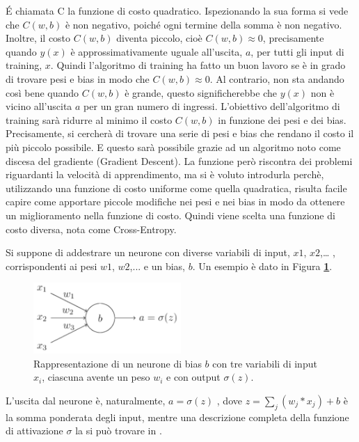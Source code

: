 \'E chiamata C la funzione di costo quadratico. Ispezionando la sua forma si vede che $C( w,b )$ è non negativo, poiché ogni termine della somma è non negativo. Inoltre, il costo $C( w,b )$ diventa piccolo, cioè $C( w,b ) \approx 0$, precisamente quando $y( x )$ è approssimativamente uguale all'uscita, $a$, per tutti gli input di training, $x$.
Quindi l'algoritmo di training ha fatto un buon lavoro se è in grado di trovare pesi e bias in modo che $C( w , b ) \approx 0$. Al contrario, non sta andando così bene quando $C( w , b )$ è grande, questo significherebbe che $y( x )$ non è vicino all'uscita $a$ per un gran numero di ingressi. 
L'obiettivo dell'algoritmo di training sarà ridurre al minimo il costo $C( w , b )$ in funzione dei pesi e dei bias. Precisamente, si cercherà di trovare una serie di pesi e bias che rendano il costo il più piccolo possibile. E questo sarà possibile grazie ad un algoritmo noto come discesa del gradiente (Gradient Descent).
La funzione però riscontra dei problemi riguardanti la velocità di apprendimento, ma si è voluto introdurla perchè, utilizzando una funzione di costo uniforme come quella quadratica, risulta facile capire come apportare piccole modifiche nei pesi e nei bias in modo da ottenere un miglioramento nella funzione di costo. Quindi viene scelta una funzione di costo diversa, nota come Cross-Entropy. 

Si suppone di addestrare un neurone con diverse variabili di input,  $x1$, $x2$,… , corrispondenti ai pesi $w1$, $w2$,... e un bias, $b$. Un esempio è dato in Figura \textbf{\ref{fig:crossentropy}}.

\begin{figure}
\centering
\includegraphics[width=%
0.5\textwidth]{figures/CrossEntropy}
\caption[Neurone Cross-Entropy.]{Rappresentazione di un neurone di bias $b$ con tre variabili di input $x_i$, ciascuna avente un peso $w_i$ e con output $\sigma(z)$.
\label{fig:crossentropy}}
\end{figure} 

L'uscita dal neurone è, naturalmente, $a=σ(z)$ , dove $z=\sum_j ( w_j * x_j ) + b$ è la somma ponderata degli input, mentre una descrizione completa della funzione di attivazione $\sigma$ la si può trovare in \cite[60-64]{Kriesel2007NeuralNetworks}.

